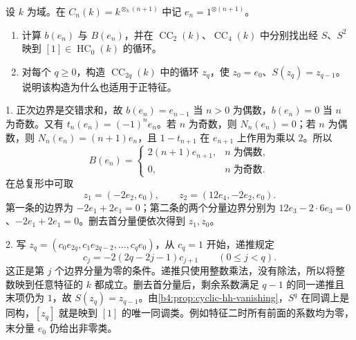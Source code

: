\begin{optionalexercise}\label{b4:ex:cyclic-field-representatives}
	设 \(k\) 为域。在 \(C_n(k)=k^{\otimes_k(n+1)}\) 中记 \(e_n=1^{\otimes(n+1)}\)。
	\begin{enumerate}
		\item 计算 \(b(e_n)\) 与 \(B(e_n)\)，并在 \(\operatorname{CC}_2(k)\)、\(\operatorname{CC}_4(k)\) 中分别找出经 \(S\)、\(S^2\) 映到 \([1]\in\operatorname{HC}_0(k)\) 的循环。
		\item 对每个 \(q\ge0\)，构造 \(\operatorname{CC}_{2q}(k)\) 中的循环 \(z_q\)，使 \(z_0=e_0\)、\(S(z_q)=z_{q-1}\)。说明该构造为什么也适用于正特征。
	\end{enumerate}
\end{optionalexercise}
\begin{solution}
	1. 正次边界是交错求和，故 \(b(e_n)=e_{n-1}\) 当 \(n>0\) 为偶数，\(b(e_n)=0\) 当 \(n\) 为奇数。又有 \(t_n(e_n)=(-1)^n e_n\)。若 \(n\) 为奇数，则 \(N_n(e_n)=0\)；若 \(n\) 为偶数，则 \(N_n(e_n)=(n+1)e_n\)，且 \(1-t_{n+1}\) 在 \(e_{n+1}\) 上作用为乘以 \(2\)。所以
	\[
		B(e_n)=
		\begin{cases}
			2(n+1)e_{n+1},&n\;\text{为偶数},\\
			0,&n\;\text{为奇数}.
		\end{cases}
	\]
	在总复形中可取
	\[
		z_1=(-2e_2,e_0),\qquad z_2=(12e_4,-2e_2,e_0).
	\]
	第一条的边界为 \(-2e_1+2e_1=0\)；第二条的两个分量边界分别为 \(12e_3-2\cdot6e_3=0\)、\(-2e_1+2e_1=0\)。删去首分量便依次得到 \(z_1,z_0\)。

	2. 写 \(z_q=(c_0e_{2q},c_1e_{2q-2},\ldots,c_qe_0)\)，从 \(c_q=1\) 开始，递推规定
	\[
		c_j=-2(2q-2j-1)c_{j+1}\qquad(0\le j<q).
	\]
	这正是第 \(j\) 个边界分量为零的条件。递推只使用整数乘法，没有除法，所以将整数映到任意特征的 \(k\) 都成立。删去首分量后，剩余系数满足 \(q-1\) 的同一递推且末项仍为 \(1\)，故 \(S(z_q)=z_{q-1}\)。由\cref{b4:prop:cyclic-hh-vanishing}，\(S^q\) 在同调上是同构，\([z_q]\) 就是映到 \([1]\) 的唯一同调类。例如特征二时所有前面的系数均为零，末分量 \(e_0\) 仍给出非零类。
\end{solution}

